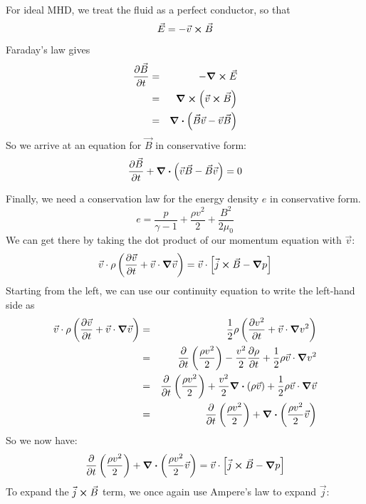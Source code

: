 \documentclass[%
 reprint,
 amsmath,amssymb,
 aps,
]{revtex4-2}
\begin{document}
For ideal MHD, we treat the fluid as a perfect conductor, so that
\begin{equation}
\vec E = - \vec v \cross \vec B
\end{equation}
Faraday's law gives
\begin{eqnarray}
\pdv{\vec B}{t} & = &  - \curl \vec E\\
& = & \curl (\vec v \cross \vec B) \\
& = & \div ( \vec B \vec v - \vec v \vec B)
\end{eqnarray}
So we arrive at an equation for $\vec B$ in conservative form:
\begin{equation}
\pdv{\vec B}{t} + \div (\vec v \vec B - \vec B \vec v) = 0
\end{equation}

Finally, we need a conservation law for the energy density $e$ in conservative form.
\begin{equation}
e = \frac{p}{\gamma - 1} + \frac{\rho v^2}{2} + \frac{B^2}{2 \mu_0}
\end{equation}
We can get there by taking the dot product of our momentum equation with $\vec v$:
\begin{equation}
\vec v \cdot \rho \left( \pdv{\vec v}{t} + \vec v \cdot \grad \vec v\right) = \vec v \cdot \left[ \vec j \cross \vec B - \grad p \right]
\end{equation}
Starting from the left, we can use our continuity equation to write the left-hand side as
\begin{eqnarray}
\vec v \cdot \rho \left( \pdv{\vec v}{t} + \vec v \cdot \grad \vec v\right) & = & \frac{1}{2} \rho \left( \pdv{v^2}{t} + \vec v \cdot \grad v^2 \right) \\
& = & \pdv{}{t} \left( \frac{\rho v^2}{2} \right) - \frac{v^2}{2} \pdv{\rho}{t} + \frac{1}{2} \rho \vec v \cdot \grad v^2 \\
& = & \pdv{}{t} \left( \frac{\rho v^2}{2} \right) + \frac{v^2}{2} \div (\rho \vec v) + \frac{1}{2} \rho \vec v \cdot \grad \vec v \\
& = & \pdv{}{t} \left( \frac{\rho v^2}{2} \right) + \div \left( \frac{\rho v^2}{2} \vec v \right)
\end{eqnarray}
So we now have:
\begin{equation}
\pdv{}{t} \left( \frac{\rho v^2}{2} \right) + \div \left( \frac{\rho v^2}{2} \vec v \right) = \vec v \cdot \left[ \vec j \cross \vec B - \grad p \right]
\end{equation}
To expand the $\vec j \cross \vec B$ term, we once again use Ampere's law to expand $\vec j$:
\end{document}

